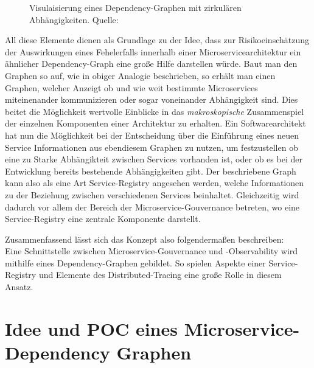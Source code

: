 \documentclass[
	12pt,
	BCOR=5mm,
	DIV=12,
	headinclude=on,
	footinclude=off,
	parskip=half,
	bibliography=totoc,
	listof=entryprefix,
	toc=listof,
	numbers=noenddot,
	plainfootsepline
]{scrreprt}
\begin{document}
\begin{figure}[h]
	\centering
	\caption[Dependency Graph]{Visulaisierung eines Dependency-Graphen mit zirkulären Abhängigkeiten. Quelle: \cite[]{GraphViz}}
	\label{fig:GraphViz}
\end{figure}
 All diese Elemente dienen als Grundlage zu der Idee, dass zur Risikoeinschätzung der Auswirkungen eines Fehelerfalls innerhalb einer Microservicearchitektur ein ähnlicher Dependency-Graph eine große Hilfe darstellen würde. Baut man den Graphen so auf, wie in obiger Analogie beschrieben, so erhält man einen Graphen, welcher Anzeigt ob und wie weit bestimmte Microservices miteinenander kommunizieren oder sogar voneinander Abhängigkeit sind. Dies beitet die Möglichkeit wertvolle Einblicke in das \textit{makroskopische} Zusammenspiel der einzelnen Komponenten einer Architektur zu erhalten. Ein Softwarearchitekt hat nun die Möglichkeit bei der Entscheidung über die Einführung eines neuen Service Informationen aus ebendiesem Graphen zu nutzen, um festzustellen ob eine zu Starke Abhängikteit zwischen Services vorhanden ist, oder ob es bei der Entwicklung bereits bestehende Abhängigkeiten gibt.
Der beschriebene Graph kann also als eine Art Service-Registry angesehen werden, welche Informationen zu der Beziehung zwischen verschiedenen Services beinhaltet. Gleichzeitig wird dadurch vor allem der Bereich der Microservice-Gouvernance betreten, wo eine Service-Registry eine zentrale Komponente darstellt. 

Zusammenfassend lässt sich das Konzept also folgendermaßen beschreiben: \\
Eine Schnittstelle zwischen Microservice-Gouvernance und -Observability wird mithilfe eines Dependency-Graphen gebildet. So spielen Aspekte einer Service-Registry und Elemente des Distributed-Tracing eine große Rolle in diesem Ansatz.

\chapter{Idee und POC eines Microservice-Dependency Graphen}\label{chap:KonzepTool}
\end{document}

